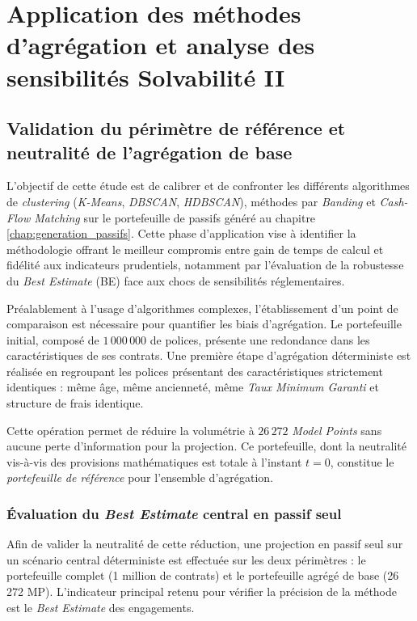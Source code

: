 \chapter{Application des méthodes d'agrégation et analyse des sensibilités Solvabilité II}
\label{chap:application_numerique}

\section{Validation du périmètre de référence et neutralité de l'agrégation de base}
\label{sec:validation_reference}

L'objectif de cette étude est de calibrer et de confronter les différents algorithmes de \textit{clustering} (\textit{K-Means}, \textit{DBSCAN}, \textit{HDBSCAN}), méthodes par \textit{Banding} et \textit{Cash-Flow Matching} sur le portefeuille de passifs généré au chapitre \ref{chap:generation_passifs}. Cette phase d'application vise à identifier la méthodologie offrant le meilleur compromis entre gain de temps de calcul et fidélité aux indicateurs prudentiels, notamment par l'évaluation de la robustesse du \textit{Best Estimate} (BE) face aux chocs de sensibilités réglementaires.

Préalablement à l'usage d'algorithmes complexes, l'établissement d'un point de comparaison est nécessaire pour quantifier les biais d'agrégation. Le portefeuille initial, composé de $1\,000\,000$ de polices, présente une redondance dans les caractéristiques de ses contrats. Une première étape d'agrégation déterministe est réalisée en regroupant les polices présentant des caractéristiques strictement identiques : même âge, même ancienneté, même \textit{Taux Minimum Garanti} et structure de frais identique. 

Cette opération permet de réduire la volumétrie à $26\,272$ \textit{Model Points} sans aucune perte d'information pour la projection. Ce portefeuille, dont la neutralité vis-à-vis des provisions mathématiques est totale à l'instant $t=0$, constitue le \textit{portefeuille de référence} pour l'ensemble d'agrégation.

\subsection{Évaluation du \textit{Best Estimate} central en passif seul}

Afin de valider la neutralité de cette réduction, une projection en passif seul sur un scénario central déterministe est effectuée sur les deux périmètres : le portefeuille complet (1 million de contrats) et le portefeuille agrégé de base (26 272 MP). L'indicateur principal retenu pour vérifier la précision de la méthode est le \textit{Best Estimate} des engagements.

